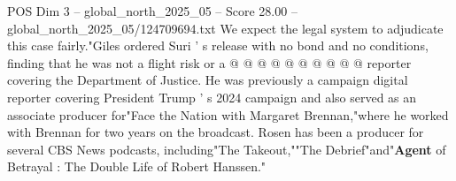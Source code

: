 \begin{textsample}{POS Dim 3 – global\_north\_2025\_05 – Score 28.00 – global\_north\_2025\_05/124709694.txt}
We expect the legal system to adjudicate this case fairly."Giles ordered Suri ' s release with no bond and no conditions, finding that he was not a flight risk or a @ @ @ @ @ @ @ @ @ @ reporter covering the Department of Justice.
He was previously a campaign digital reporter covering President Trump ' s 2024 campaign and also served as an associate producer for"Face the Nation with Margaret Brennan,"where he worked with Brennan for two years on the broadcast.
Rosen has been a producer for several CBS News podcasts, including"The Takeout,""The Debrief"and"\textbf{Agent} of Betrayal : The Double Life of Robert Hanssen."

\end{textsample}
